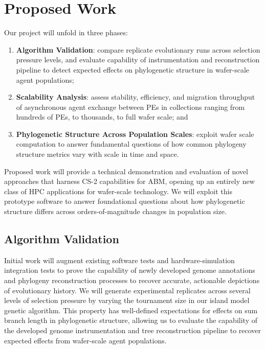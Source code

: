 \section{Proposed Work} \label{sec:objectives}

Our project will unfold in three phases:
\begin{enumerate}
\item \textbf{Algorithm Validation}: compare replicate evolutionary runs across selection pressure levels, and evaluate capability of instrumentation and reconstruction pipeline to detect expected effects on phylogenetic structure in wafer-scale agent populations;
\item \textbf{Scalability Analysis}: assess stability, efficiency, and migration throughput of asynchronous agent exchange between PEs in collections ranging from hundreds of PEs, to thousands, to full wafer scale; and
\item \textbf{Phylogenetic Structure Across Population Scales}: exploit wafer scale computation to answer fundamental questions of how common phylogeny structure metrics vary with scale in time and space.
\end{enumerate}

Proposed work will provide a technical demonstration and evaluation of novel approaches that harness CS-2 capabilities for ABM, opening up an entirely new class of HPC applications for wafer-scale technology.
We will exploit this prototype software to answer foundational questions about how phylogenetic structure differs across orders-of-magnitude changes in population size.

\subsection{Algorithm Validation}

Initial work will augment existing software tests and hardware-simulation integration tests to prove the capability of newly developed genome annotations and phylogeny reconstruction processes to recover accurate, actionable depictions of evolutionary history.
We will generate experimental replicates across several levels of selection pressure by varying the tournament size in our island model genetic algorithm.
This property has well-defined expectations for effects on sum branch length in phylogenetic structure, allowing us to evaluate the capability of the developed genome instrumentation and tree reconstruction pipeline to recover expected effects from wafer-scale agent populations.

